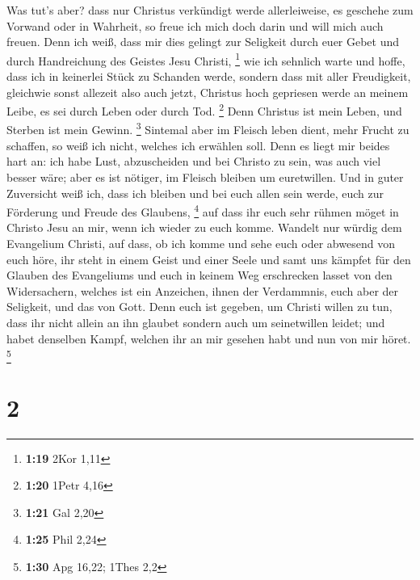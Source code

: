 Was tut's aber? dass nur Christus verkündigt werde allerleiweise, es
geschehe zum Vorwand oder in Wahrheit, so freue ich mich doch darin und
will mich auch freuen.  Denn ich weiß, dass mir dies
gelingt zur Seligkeit durch euer Gebet und durch Handreichung des
Geistes Jesu Christi, \footnote{\textbf{1:19} 2Kor 1,11} 
wie ich sehnlich warte und hoffe, dass ich in keinerlei Stück zu
Schanden werde, sondern dass mit aller Freudigkeit, gleichwie sonst
allezeit also auch jetzt, Christus hoch gepriesen werde an meinem Leibe,
es sei durch Leben oder durch Tod. \footnote{\textbf{1:20} 1Petr 4,16}
 Denn Christus ist mein Leben, und Sterben ist mein
Gewinn. \footnote{\textbf{1:21} Gal 2,20}  Sintemal aber
im Fleisch leben dient, mehr Frucht zu schaffen, so weiß ich nicht,
welches ich erwählen soll.  Denn es liegt mir beides hart
an: ich habe Lust, abzuscheiden und bei Christo zu sein, was auch viel
besser wäre;  aber es ist nötiger, im Fleisch bleiben um
euretwillen.  Und in guter Zuversicht weiß ich, dass ich
bleiben und bei euch allen sein werde, euch zur Förderung und Freude des
Glaubens, \footnote{\textbf{1:25} Phil 2,24}  auf dass
ihr euch sehr rühmen möget in Christo Jesu an mir, wenn ich wieder zu
euch komme.  Wandelt nur würdig dem Evangelium Christi,
auf dass, ob ich komme und sehe euch oder abwesend von euch höre, ihr
steht in einem Geist und einer Seele und samt uns kämpfet für den
Glauben des Evangeliums  und euch in keinem Weg
erschrecken lasset von den Widersachern, welches ist ein Anzeichen,
ihnen der Verdammnis, euch aber der Seligkeit, und das von Gott.
 Denn euch ist gegeben, um Christi willen zu tun, dass
ihr nicht allein an ihn glaubet sondern auch um seinetwillen leidet;
 und habet denselben Kampf, welchen ihr an mir gesehen
habt und nun von mir höret. \footnote{\textbf{1:30} Apg 16,22; 1Thes 2,2}

\hypertarget{section-1}{%
\section{2}\label{section-1}}

